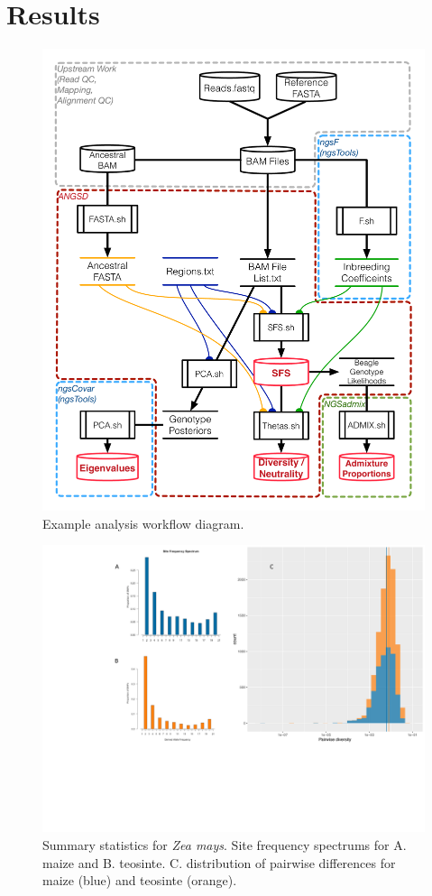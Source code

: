 \documentclass[10pt,a4paper]{article}
\begin{document}
\section*{Results}

\begin{figure}
\centering
\includegraphics[width=\linewidth]{figures/MainTextWorkflow.pdf}
\caption{Example analysis workflow diagram.}
\label{fig:workflow}
\end{figure}

\begin{figure}
\centering
\includegraphics[width=\linewidth]{figures/figure3big.pdf}
\caption{Summary statistics for {\it Zea mays}. Site frequency spectrums for A. maize and B. teosinte. C. distribution of pairwise differences for maize (blue) and teosinte (orange).}
\label{fig:figure3}
\end{figure}
\end{document}
